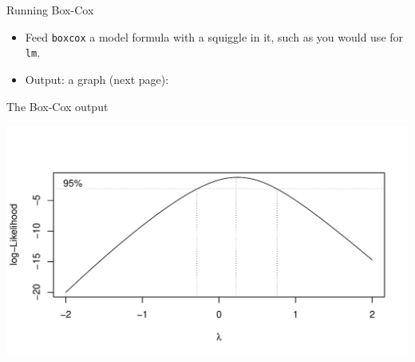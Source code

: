 \begin{frame}[fragile]{Running Box-Cox}
  
  \begin{itemize}
  \item Feed \texttt{boxcox} a model formula with a squiggle in it,
    such as you would use for \texttt{lm}.
  \item Output: a graph (next page):
 
\begin{knitrout}
\color{fgcolor}\begin{kframe}
\begin{alltt}
\hlopt{~}
\end{alltt}
\end{kframe}
\end{knitrout}
    
  \end{itemize}
  
\end{frame}

\begin{frame}[fragile]{The Box-Cox output}
  
 
\begin{knitrout}
\color{fgcolor}
\includegraphics[width=\maxwidth]{figure/trento-1} 

\end{knitrout}
  
  
\end{frame}

